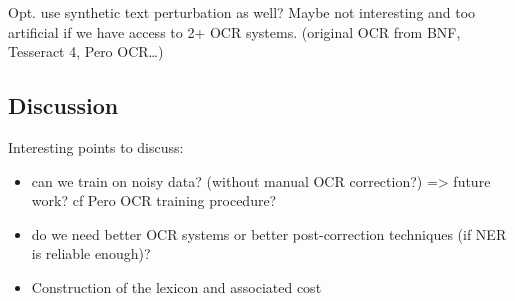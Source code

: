 Opt. use synthetic text perturbation as well? Maybe not interesting and too artificial if we have access to 2+ OCR systems.
(original OCR from BNF, Tesseract 4, Pero OCR…)


\subsection{Discussion}
Interesting points to discuss:
\begin{itemize}
    \item can we train on noisy data? (without manual OCR correction?) => future work? cf Pero OCR training procedure?
    \item do we need better OCR systems or better post-correction techniques (if NER is reliable enough)?
    \item Construction of the lexicon and associated cost
\end{itemize}
